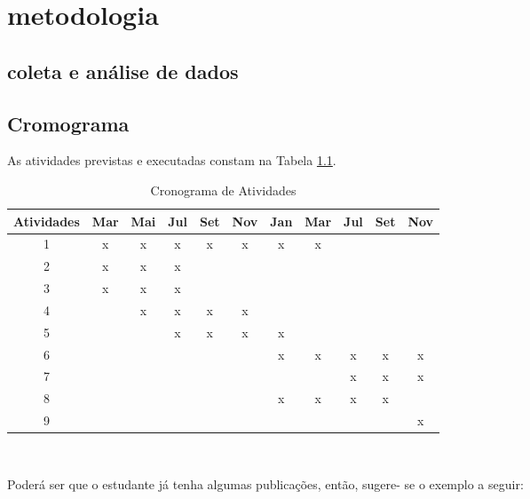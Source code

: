 \chapter[METODOLOGIA]{\textbf {metodologia}}

\section[COLETA E ANÁLISE DE DADOS]{coleta e análise de dados}

\section[CRONOGRAMA]{Cromograma}

As atividades previstas e executadas constam na Tabela \ref{tabtreta}.


\begin{table}[htb]
\caption{Cronograma de Atividades}

\label{tabtreta}
\centering
\begin{tabular}{|c|c|c|c|c|c|c|c|c|c|c|}
\hline
Atividades  & Mar & Mai & Jul & Set & Nov & Jan & Mar & Jul& Set & Nov  \\
\hline 
1	& x & x & x & x & x & x & x &   &   &   \\ \hline
2	& x & x & x &   &   &   &   &   &   &   \\ \hline
3	& x & x & x &   &   &   &   &   &   &   \\ \hline
4 	&   & x & x & x & x &   &   &   &   &   \\ \hline
5	&   &   & x & x & x & x &   &   &   &   \\ \hline
6	&   &   &   &   &   & x & x & x & x & x \\ \hline
7 	&   &   &   &   &   &   &   & x & x & x \\ \hline
8	&   &   &   &   &   & x & x & x & x &   \\ \hline
9 	&   &   &   &   &   &   &   &   &   & x \\ \hline
\end{tabular}\\
\end{table}

Poderá ser que o estudante já tenha algumas publicações, então, sugere-
se o exemplo a seguir:

